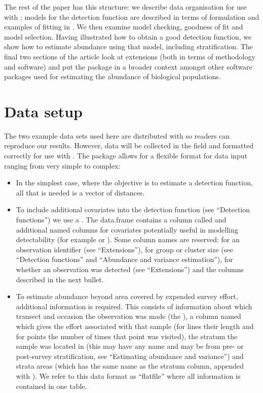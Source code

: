 \documentclass[article]{jss}
\begin{document}
The rest of the paper has this structure: we describe data organisation
for use with ; models for the detection function are
described in terms of formulation and examples of fitting in
. We then examine model checking, goodness of fit and model
selection. Having illustrated how to obtain a good detection function,
we show how to estimate abundance using that model, including
stratification. The final two sections of the article look at extensions
(both in terms of methodology and software) and put the package in a
broader context amongst other software packages used for estimating the
abundance of biological populations.

\section{Data setup}\label{data-setup}

The two example data sets used here are distributed with 
so readers can reproduce our results. However, data will be collected in
the field and formatted correctly for use with . The
package allows for a flexible format for data input ranging from very
simple to complex:

\begin{itemize}
\itemsep1pt\parskip0pt
\item
  In the simplest case, where the objective is to estimate a detection
  function, all that is needed is a vector of distances.
\item
  To include additional covariates into the detection function (see
  ``Detection functions'') we use a . The data.frame
  contains a column called  and additional named columns
  for covariates potentially useful in modelling detectability (for
  example  or ). Some column names are
  reserved:  for an observation identifier (see
  ``Extensions''),  for group or cluster size (see
  ``Detection functions'' and ``Abundance and variance estimation''),
   for whether an observation was detected (see
  ``Extensions'') and the columns described in the next bullet.
\item
  To estimate abundance beyond area covered by expended survey effort,
  additional information is required. This consists of information about
  which transect and occasion the observation was made (the
  ), a column named  which gives the
  effort associated with that sample (for lines their length and for
  points the number of times that point was visited), the stratum the
  sample was located in (this may have any name and may be from pre- or
  post-survey stratification, see ``Estimating abundance and variance'')
  and strata areas (which has the same name as the stratum column,
  appended with ). We refer to this data format as
  ``flatfile'' where all information is contained in one table.
\end{itemize}
\end{document}
